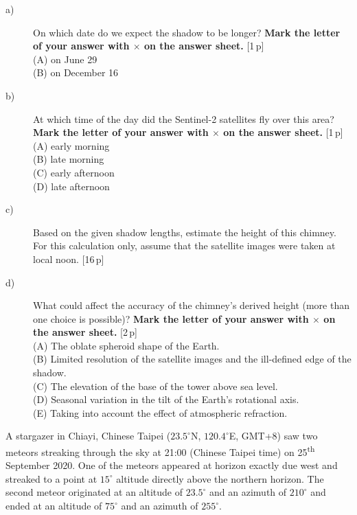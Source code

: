 \begin{description}
\item[a)] On which date do we expect the shadow to be longer? \textbf{Mark the
  letter of your answer with $\times$ on the answer sheet.} \hfill[1\,p]\\
  (A) on June 29\\
  (B) on December 16
\item[b)] At which time of the day did the Sentinel-2 satellites fly over this
  area? \textbf{Mark the letter of your answer with $\times$ on the answer
  sheet.} \hfill[1\,p]\\
  (A) early morning\\
  (B) late morning\\
  (C) early afternoon\\
  (D) late afternoon
\item[c)] Based on the given shadow lengths, estimate the height of this
  chimney. For this calculation only, assume that the satellite images were
  taken at local noon. \hfill[16\,p]
\item[d)] What could affect the accuracy of the chimney's derived height (more
  than one choice is possible)? \textbf{Mark the letter of your answer with
  $\times$ on the answer sheet.} \hfill[2\,p]\\
  (A) The oblate spheroid shape of the Earth.\\
  (B) Limited resolution of the satellite images and the ill-defined edge of
  the shadow.\\
  (C) The elevation of the base of the tower above sea level.\\
  (D) Seasonal variation in the tilt of the Earth's rotational axis.\\
  (E) Taking into account the effect of atmospheric refraction.
\end{description}

A stargazer in Chiayi, Chinese Taipei ($23.5^\circ$N, $120.4^\circ$E, GMT+8)
saw two meteors streaking through the sky at 21:00 (Chinese Taipei time) on
25\textsuperscript{th} September 2020. One of the meteors appeared at horizon
exactly due west and streaked to a point at $15^\circ$ altitude directly above
the northern horizon. The second meteor originated at an altitude of
$23.5^\circ$ and an azimuth of $210^\circ$ and ended at an altitude of
$75^\circ$ and an azimuth of $255^\circ$.

